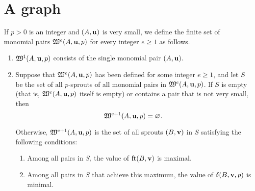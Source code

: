 \documentclass[11pt]{amsart}
\begin{document}
\newpage


\section{A graph}



\begin{definition}  If $p>0$ is an integer and $(A, \mathbf{u})$ is very small, we define the finite set of monomial pairs $\mathfrak{W}^e(A, \mathbf{u}, p)$ for every integer $e \geq 1$ as follows.

\begin{enumerate}
\item $\mathfrak{W}^1(A, \mathbf{u}, p)$ consists of the single monomial pair $(A, \mathbf{u})$.
\item Suppose that $\mathfrak{W}^e(A, \mathbf{u}, p)$ has been defined for some integer $e \geq 1$, and let $S$ be the set of all $p$-sprouts of all monomial pairs in $\mathfrak{W}^e(A, \mathbf{u}, p)$.  If  $S$ is empty (that is, $\mathfrak{W}^e(A, \mathbf{u}, p)$ itself is empty) or contains a pair that is not very small, then \[ \mathfrak{W}^{e+1}(A, \mathbf{u}, p) = \varnothing.\]  

Otherwise, $\mathfrak{W}^{e+1}(A, \mathbf{u}, p)$ is the set of all sprouts $(B, \mathbf{v})$ in $S$ satisfying the following conditions:    

\begin{enumerate}
\item Among all pairs in $S$, the value of  $\operatorname{ft}(B, \mathbf{v})$ is maximal.
\item Among all pairs in $S$ that achieve this maximum, the value of $\delta(B, \mathbf{v}, p)$ is minimal.
\end{enumerate}
\end{enumerate}
\end{definition}
\end{document}
